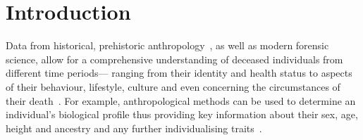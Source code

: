 \documentclass[sw]{iosart2x}
\newcommand{\aw}{AnthroWorks3D}
\begin{document}
\begin{frontmatter}
\begin{abstract}
Anthropology relies on osteometric measurements of human bones, but ...
In this paper, first, we describe the anthropology domain.
Then, we discuss design decisions of modelling ANNO.
Next, we show how ANNO is published for the community.
Finally, we describe the integration of the ontology into \aw{}.
\end{abstract}

\begin{keyword}
\end{keyword}

\end{frontmatter}



\section{Introduction}\label{sec:introduction}

Data from historical, prehistoric anthropology~\citep{prehistoricanthropology}, as well as modern forensic science, allow for a comprehensive understanding of deceased individuals from different time periods---
ranging from their identity and health status to aspects of their behaviour, lifestyle, culture and even concerning the circumstances of their death~\citep{spurensuche}.
For example, anthropological methods can be used to determine an individual's biological profile thus providing key information about their sex, age, height and ancestry and any further individualising traits~\citep{bioprofile}.
\end{document}
